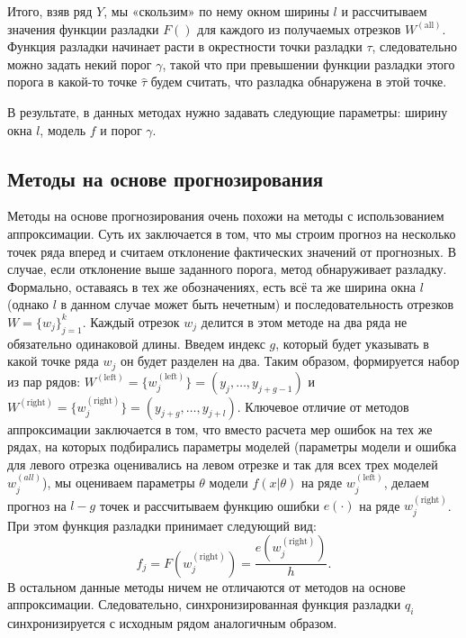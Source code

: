 \documentclass[%
12pt,
master,  %
natbib,      %
subf,        %
substylefile = spbu.rtx,
href,        %
colorlinks,  %
]{disser}
\begin{document}
Итого, взяв ряд $Y$, мы «скользим» по нему окном ширины $l$ и рассчитываем значения функции разладки $F()$ для каждого из получаемых отрезков $W^{\mathrm{(all)}}$. Функция разладки начинает расти в окрестности точки разладки $\tau$, следовательно можно задать некий порог $\gamma$, такой что при превышении функции разладки этого порога в какой-то точке $\hat{\tau}$ будем считать, что разладка обнаружена в этой точке.

В результате, в данных методах нужно задавать следующие параметры: ширину окна $l$, модель $f$ и порог $\gamma$.

\subsection{Методы на основе прогнозирования}

Методы на основе прогнозирования очень похожи на методы с использованием аппроксимации. Суть их заключается в том, что мы строим прогноз на несколько точек ряда вперед и считаем отклонение фактических значений от прогнозных. В случае, если отклонение выше заданного порога, метод обнаруживает разладку.
Формально, оставаясь в тех же обозначениях, есть всё та же ширина окна $l$ (однако $l$ в данном случае может быть нечетным) и последовательность отрезков $W = \{ w_j \}_{j=1}^k$. Каждый отрезок  $w_j$ делится в этом методе на два ряда не обязательно одинаковой длины. Введем индекс $g$, который будет указывать в какой точке ряда $w_j$ он будет разделен на два. Таким образом, формируется набор из пар рядов:  $ W^{\mathrm{(left)}} = \{w_j^{\mathrm{(left)}} \}  =  (y_j, \dots, y_{j+g-1})$ и $W^{\mathrm{(right)}} = \{w_j^{\mathrm{(right)}} \} = (y_{j+g}, \dots, y_{j+l})$. Ключевое отличие от методов аппроксимации заключается в том, что вместо расчета мер ошибок на тех же рядах, на которых подбирались параметры моделей (параметры модели и ошибка для левого отрезка оценивались на левом отрезке и так для всех трех моделей $w_j^{(all)}$), мы оцениваем параметры $\theta$ модели $f(x|\theta)$ на ряде $ w_j^{\mathrm{(left)}} $, делаем прогноз на $ l - g $ точек и рассчитываем функцию ошибки $ e(\cdot) $ на ряде $ w_j^{\mathrm{(right)}} $. При этом функция разладки принимает следующий вид:
	\begin{equation*}
	 f_j = F(w_j^{\mathrm{(right)}}) = \frac{e(w_j^{\mathrm{(right)}})}{h}.
	 \end{equation*}
В остальном данные методы ничем не отличаются от методов на основе аппроксимации. Следовательно, синхронизированная функция разладки $q_i$ синхронизируется с исходным рядом аналогичным образом.
\end{document}
